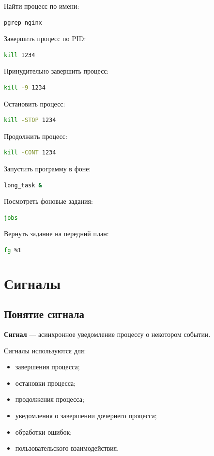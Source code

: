 \documentclass[12pt,a4paper]{article}
\begin{document}
Найти процесс по имени:

\begin{lstlisting}[language=bash]
pgrep nginx
\end{lstlisting}

Завершить процесс по PID:

\begin{lstlisting}[language=bash]
kill 1234
\end{lstlisting}

Принудительно завершить процесс:

\begin{lstlisting}[language=bash]
kill -9 1234
\end{lstlisting}

Остановить процесс:

\begin{lstlisting}[language=bash]
kill -STOP 1234
\end{lstlisting}

Продолжить процесс:

\begin{lstlisting}[language=bash]
kill -CONT 1234
\end{lstlisting}

Запустить программу в фоне:

\begin{lstlisting}[language=bash]
long_task &
\end{lstlisting}

Посмотреть фоновые задания:

\begin{lstlisting}[language=bash]
jobs
\end{lstlisting}

Вернуть задание на передний план:

\begin{lstlisting}[language=bash]
fg %1
\end{lstlisting}

\section{Сигналы}

\subsection{Понятие сигнала}

\textbf{Сигнал} --- асинхронное уведомление процессу о некотором событии.

Сигналы используются для:
\begin{itemize}
    \item завершения процесса;
    \item остановки процесса;
    \item продолжения процесса;
    \item уведомления о завершении дочернего процесса;
    \item обработки ошибок;
    \item пользовательского взаимодействия.
\end{itemize}
\end{document}
